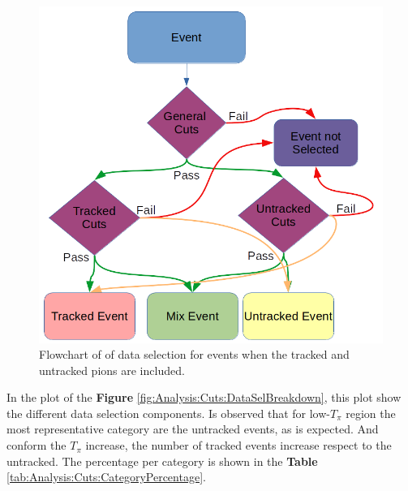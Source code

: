 \begin{figure}[!htb]
    \centering
    \includegraphics[scale=0.4]{Figures/Chapter4/DataSelection/EventSelFlowchart.png}
    \caption{Flowchart of of data selection for events when the tracked and untracked pions are included.}
    \label{fig:Analysis:Cuts:Flowchart}
\end{figure}

In the plot of the \textbf{Figure} \ref{fig:Analysis:Cuts:DataSelBreakdown}, this plot show the different data selection components. Is observed that for low-$T_\pi$ region the most representative category are the untracked events, as is expected. And conform the $T_\pi$ increase, the number of tracked events increase respect to the untracked. The percentage per category is shown in the \textbf{Table} \ref{tab:Analysis:Cuts:CategoryPercentage}.

